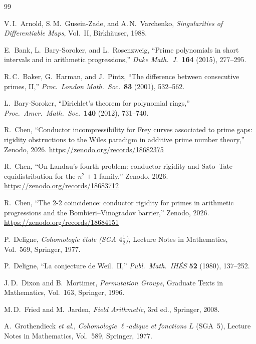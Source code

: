 \documentclass[11pt, a4paper]{article}
\theoremstyle{definition}
\theoremstyle{remark}
\begin{document}
\begin{thebibliography}{99}

  V.\,I.~Arnold, S.\,M.~Gusein-Zade, and A.\,N.~Varchenko,
  \textit{Singularities of Differentiable Maps}, Vol.~II,
  Birkh\"auser, 1988.

  E.~Bank, L.~Bary-Soroker, and L.~Rosenzweig,
  ``Prime polynomials in short intervals and in arithmetic
  progressions,''
  \textit{Duke Math.\ J.}\ \textbf{164} (2015), 277--295.

  R.\,C.~Baker, G.~Harman, and J.~Pintz,
  ``The difference between consecutive primes, II,''
  \textit{Proc.\ London Math.\ Soc.}\ \textbf{83} (2001), 532--562.

  L.~Bary-Soroker,
  ``Dirichlet's theorem for polynomial rings,''
  \textit{Proc.\ Amer.\ Math.\ Soc.}\ \textbf{140} (2012), 731--740.

  R.~Chen,
  ``Conductor incompressibility for Frey curves associated to
  prime gaps: rigidity obstructions to the Wiles paradigm in
  additive prime number theory,''
  Zenodo, 2026.
  \url{https://zenodo.org/records/18682375}

  R.~Chen,
  ``On Landau's fourth problem: conductor rigidity and
  Sato--Tate equidistribution for the $n^2+1$ family,''
  Zenodo, 2026.
  \url{https://zenodo.org/records/18683712}

  R.~Chen,
  ``The 2-2 coincidence: conductor rigidity for primes in
  arithmetic progressions and the Bombieri--Vinogradov barrier,''
  Zenodo, 2026.
  \url{https://zenodo.org/records/18684151}

  P.~Deligne,
  \textit{Cohomologie \'{e}tale (SGA $4\tfrac{1}{2}$)},
  Lecture Notes in Mathematics, Vol.~569, Springer, 1977.

  P.~Deligne,
  ``La conjecture de Weil.\ II,''
  \textit{Publ.\ Math.\ IH\'ES} \textbf{52} (1980), 137--252.

  J.\,D.~Dixon and B.~Mortimer,
  \textit{Permutation Groups},
  Graduate Texts in Mathematics, Vol.~163, Springer, 1996.

  M.\,D.~Fried and M.~Jarden,
  \textit{Field Arithmetic}, 3rd ed.,
  Springer, 2008.

  A.~Grothendieck \textit{et al.},
  \textit{Cohomologie $\ell$-adique et fonctions $L$} (SGA~5),
  Lecture Notes in Mathematics, Vol.~589, Springer, 1977.


\end{thebibliography}
\end{document}
